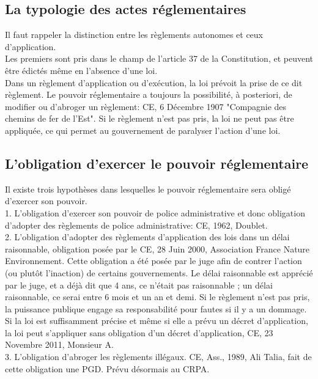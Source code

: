 \documentclass[10pt, a4paper, openany]{book}
\begin{document}
\subsection{La typologie des actes réglementaires}

Il faut rappeler la distinction entre les règlements autonomes et ceux d'application. \\
Les premiers sont pris dans le champ de l'article 37 de la Constitution, et peuvent être édictés même en l'absence d'une loi. \\
Dans un règlement d'application ou d'exécution, la loi prévoit la prise de ce dit règlement. Le pouvoir réglementaire a toujours la possibilité, à posteriori, de modifier ou d'abroger un règlement: CE, 6 Décembre 1907 "Compagnie des chemins de fer de l'Est". Si le règlement n'est pas pris, la loi ne peut pas être appliquée, ce qui permet au gouvernement de paralyser l'action d'une loi.

\subsection{L'obligation d'exercer le pouvoir réglementaire}

Il existe trois hypothèses dans lesquelles le pouvoir réglementaire sera obligé d'exercer son pouvoir. \\
1. L'obligation d'exercer son pouvoir de police administrative et donc obligation d'adopter des règlements de police administrative: CE, 1962, Doublet. \\
2. L'obligation d'adopter des règlements d'application des lois dans un délai raisonnable, obligation posée par le CE, 28 Juin 2000, Association France Nature Environnement. Cette obligation a été posée par le juge afin de contrer l'action (ou plutôt l'inaction) de certains gouvernements. Le délai raisonnable est apprécié par le juge, et a déjà dit que 4 ans, ce n'était pas raisonnable ; un délai raisonnable, ce serai entre 6 mois et un an et demi. Si le règlement n'est pas pris, la puissance publique engage sa responsabilité pour fautes si il y a un dommage. \\
Si la loi est suffisamment précise et même si elle a prévu un décret d'application, la loi peut s'appliquer sans obligation d'un décret d'application, CE, 23 Novembre 2011, Monsieur A.  \\
3. L'obligation d'abroger les règlements illégaux. CE, Ass., 1989, Ali Talia, fait de cette obligation une PGD. Prévu désormais au CRPA. 
\end{document}
